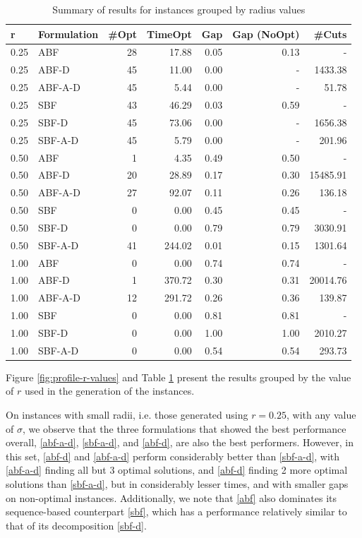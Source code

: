 \documentclass[pdflatex,sn-mathphys-num]{sn-jnl}%
\begin{document}
\begin{table}[h]
\centering
\begin{tabular}{l l r r r r r}
\toprule
r & Formulation & \#Opt & TimeOpt & Gap & Gap (NoOpt) & \#Cuts \\
\midrule
0.25 & ABF & 28 & 17.88 & 0.05 & 0.13 & - \\
0.25 & ABF-D & 45 & 11.00 & 0.00 & - & 1433.38 \\
0.25 & ABF-A-D & 45 & 5.44 & 0.00 & - & 51.78 \\
0.25 & SBF & 43 & 46.29 & 0.03 & 0.59 & - \\
0.25 & SBF-D & 45 & 73.06 & 0.00 & - & 1656.38 \\
0.25 & SBF-A-D & 45 & 5.79 & 0.00 & - & 201.96 \\
0.50 & ABF & 1 & 4.35 & 0.49 & 0.50 & - \\
0.50 & ABF-D & 20 & 28.89 & 0.17 & 0.30 & 15485.91 \\
0.50 & ABF-A-D & 27 & 92.07 & 0.11 & 0.26 & 136.18 \\
0.50 & SBF & 0 & 0.00 & 0.45 & 0.45 & - \\
0.50 & SBF-D & 0 & 0.00 & 0.79 & 0.79 & 3030.91 \\
0.50 & SBF-A-D & 41 & 244.02 & 0.01 & 0.15 & 1301.64 \\
1.00 & ABF & 0 & 0.00 & 0.74 & 0.74 & - \\
1.00 & ABF-D & 1 & 370.72 & 0.30 & 0.31 & 20014.76 \\
1.00 & ABF-A-D & 12 & 291.72 & 0.26 & 0.36 & 139.87 \\
1.00 & SBF & 0 & 0.00 & 0.81 & 0.81 & - \\
1.00 & SBF-D & 0 & 0.00 & 1.00 & 1.00 & 2010.27 \\
1.00 & SBF-A-D & 0 & 0.00 & 0.54 & 0.54 & 293.73 \\
\bottomrule
\end{tabular}
\caption{Summary of results for instances grouped by radius values}
\label{tab:general performance r-values}
\end{table}

Figure \ref{fig:profile-r-values} and Table \ref{tab:general performance r-values} present the results grouped by the value of $r$ used in the generation of the instances. 

On instances with small radii, i.e. those generated using $r=0.25$, with any value of $\sigma$, we observe that the three formulations that showed the best performance overall, \ref{abf-a-d}, \ref{sbf-a-d}, and \ref{abf-d}, are also the best performers. However, in this set, \ref{abf-d} and \ref{abf-a-d} perform considerably better than \ref{sbf-a-d}, with \ref{abf-a-d} finding all but 3 optimal solutions, and \ref{abf-d} finding 2 more optimal solutions than \ref{sbf-a-d}, but in considerably lesser times, and with smaller gaps on non-optimal instances. Additionally, we note that \ref{abf} also dominates its sequence-based counterpart \ref{sbf}, which has a performance relatively similar to that of its decomposition \ref{sbf-d}.
\end{document}
